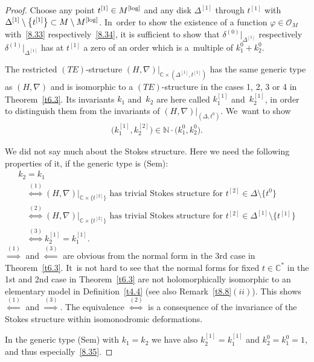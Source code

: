 \documentclass[10pt,a4paper]{amsart}
\numberwithin{equation}{section}
\numberwithin{figure}{section}
\newcommand{\N}{{\mathbb N}}
\newcommand{\C}{{\mathbb C}}
\newcommand{\OO}{{\mathcal O}}
\newcommand{\nnn}{\nabla}
\begin{document}
\begin{proof}
Choose any point $t^{[1]}\in M^{\rm [log]}$ and any disk
$\Delta^{[1]}$ through $t^{[1]}$ with
$\Delta^{[1]}\setminus \big\{t^{[1]}\big\}\subset M\setminus M^{\rm [log]}$. In~order to show the existence of a function $\varphi\in\OO_M$
with~\eqref{8.33} respectively~\eqref{8.34},
it is sufficient to show that $\delta^{(0)}|_{\Delta^{[1]}}$
respectively $\delta^{(1)}|_{\Delta^{[1]}}$
has at $t^{[1]}$ a zero of an order which is a~multiple of
$k_1^0+k_2^0$.

The restricted $(TE)$-structure
$(H,\nnn)|_{\C\times(\Delta^{[1]},t^{[1]})}$ has the same generic
type as $(H,\nnn)$ and is isomorphic to a $(TE)$-structure
in the cases 1, 2, 3 or 4 in Theorem~\ref{t6.3}.
Its invariants $k_1$ and~$k_2$ are here called
$k_1^{[1]}$ and~$k_2^{[1]}$, in order to distinguish them
from the invariants of $(H,\nnn)|_{(\Delta,t^0)}$.
We~want to show
\begin{gather}\label{8.35}
\big(k_1^{[1]},k_2^{[2]}\big)\in \N\cdot \big(k_1^0,k_2^0\big).
\end{gather}

We did not say much about the Stokes structure.
Here we need the following properties of it, if the
generic type is (Sem):
\begin{gather*}%
 k_2=k_1
 \\
\quad \stackrel{(1)}{\iff} (H,\nnn)|_{\C\times\{t^{[2]}\}}
\text{ has trivial Stokes structure for }
t^{[2]}\in\Delta\setminus \big\{t^0\big\}
 \\
\quad \stackrel{(2)}{\iff} (H,\nnn)|_{\C\times\{t^{[2]}\}}
\text{ has trivial Stokes structure for }
t^{[2]}\in\Delta^{[1]}\setminus \big\{t^{[1]}\big\}
 \\
\quad \stackrel{(3)}{\iff} k_2^{[1]}=k_1^{[1]}.
\end{gather*}
$\stackrel{(1)}{\Longrightarrow}$ and
$\stackrel{(3)}{\Longleftarrow}$ are obvious from the
normal form in the 3rd case in Theorem~\ref{t6.3}. It~is not hard to see that the normal forms for fixed
$t\in\C^*$ in the 1st and 2nd case in Theorem~\ref{t6.3}
are not holomorphically isomorphic to an
elementary model in Definition~\ref{t4.4}
(see also Remark~\ref{t8.8}$(ii)$).
This shows $\stackrel{(1)}{\Longleftarrow}$ and
$\stackrel{(3)}{\Longrightarrow}$.
The equivalence $\stackrel{(2)}{\iff}$ is a consequence
of the invariance of the Stokes structure within
isomonodromic deformations.

In the generic type (Sem) with $k_1=k_2$ we have also
$k_2^{[1]}=k_1^{[1]}$ and $k_2^0=k_1^0=1$, and thus
especially~\eqref{8.35}.


\end{proof}
\end{document}

